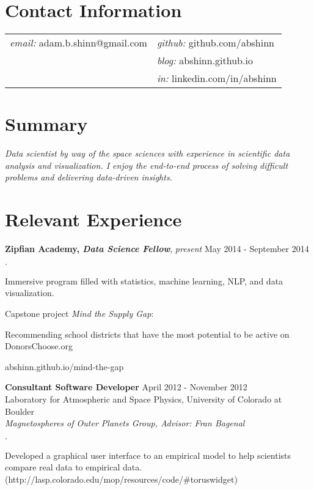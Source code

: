 \documentclass[margin,line]{res}
\newenvironment{list2}{
  \begin{list}{$\cdot$}{%
      \setlength{\itemsep}{0in}
      \setlength{\parsep}{0in} \setlength{\parskip}{0in}
      \setlength{\topsep}{0in} \setlength{\partopsep}{0in} 
      \setlength{\leftmargin}{0.2in}}}{\end{list}}
\begin{document}

\begin{resume}


\section{\sc Contact Information}

\vspace{.1 in}
\begin{tabular}{@{}p{3in}p{4in}}
{\it email:} adam.b.shinn@gmail.com & {\it github:} github.com/abshinn\\
& {\it blog:} abshinn.github.io\\
& {\it in:} linkedin.com/in/abshinn\\
\end{tabular}


\section{\sc Summary}

{\it Data scientist by way of the space sciences with experience in scientific data analysis and visualization. I enjoy the end-to-end process of solving difficult problems and delivering data-driven insights.}


\section{\sc Relevant Experience}

{\bf Zipfian Academy, {\em Data Science Fellow}}, {\em present} \hfill {May 2014 - September 2014}\\
\vspace{-.15in}
\begin{list2}
\item Immersive program filled with statistics, machine learning, NLP, and data visualization.
\item Capstone project {\em Mind the Supply Gap}:
\item[] Recommending school districts that have the most potential to be active on DonorsChoose.org
\item[] abshinn.github.io/mind-the-gap
\end{list2}

{\bf Consultant Software Developer} \hfill {April 2012 - November 2012}\\
Laboratory for Atmospheric and Space Physics, University of Colorado at Boulder\\
{\em Magnetospheres of Outer Planets Group, Advisor: Fran Bagenal}
\begin{list2}
\item Developed a graphical user interface to an empirical model to help scientists compare real data to empirical data. (http://lasp.colorado.edu/mop/resources/code/\#toruswidget)
\end{list2}


\end{resume}
\end{document}
